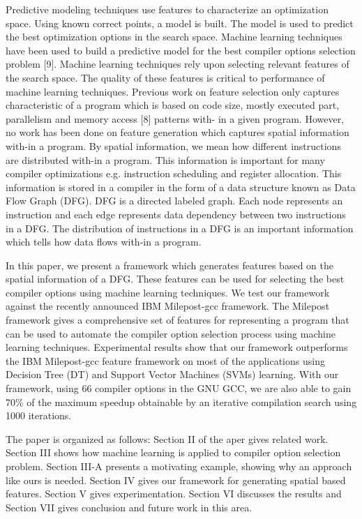\documentclass[conference]{IEEEtran}
\begin{document}
Predictive modeling techniques use features to characterize an optimization space. Using known correct points, a model is built. The model is used to predict the best optimization options in the search space. Machine learning techniques have been used to build a predictive model for the best compiler options selection problem [9]. Machine learning techniques rely upon selecting relevant features of the search space. The quality of these features is critical to performance of machine learning techniques. Previous work on feature selection only captures characteristic of a program which is based on code size, mostly executed part, parallelism and memory access [8] patterns with-
in a given program. However, no work has been done on feature generation which captures spatial information with-in a program. By spatial information, we mean how different instructions are distributed with-in a program. This information is important for many compiler optimizations e.g. instruction scheduling and register allocation. This information is stored in a compiler in the form of a data structure known as Data Flow Graph (DFG). DFG is a directed labeled graph. Each node represents an instruction and each edge represents data dependency between two instructions in a DFG. The distribution of instructions in a DFG is an important information which tells how data flows with-in a program.\par

In this paper, we present a framework which generates features based on the spatial information of a DFG. These features can be used for selecting the best compiler options using machine learning techniques. We test our framework against the recently announced IBM Milepost-gcc framework. The Milepost framework gives a comprehensive set of features for representing a program that can be used
to automate the compiler option selection process using machine learning techniques. Experimental results show that our framework outperforms the IBM Milepost-gcc feature framework on most of the applications using Decision Tree (DT) and Support Vector Machines (SVMs) learning. With our framework, using 66 compiler options in the GNU GCC, we are also able to gain 70\% of the maximum speedup obtainable by an iterative compilation search using 1000 iterations.\par

The paper is organized as follows: Section II of the aper gives related work. Section III shows how machine learning is applied to compiler option selection problem. Section III-A presents a motivating example, showing why an approach like ours is needed. Section IV gives our framework for generating spatial based features. Section V gives experimentation. Section VI discusses the results and Section VII gives conclusion and future work in this area.
\end{document}
